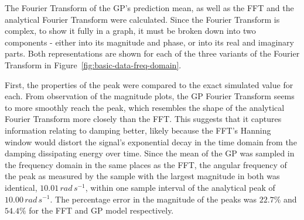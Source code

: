 \documentclass[12pt]{article}
\begin{document}
    The Fourier Transform of the GP's prediction mean, as well as the FFT and the analytical Fourier Transform were calculated.
    Since the Fourier Transform is complex, to show it fully in a graph, it must be broken down into two components - either into its magnitude and phase, or into its real and imaginary parts.
    Both representations are shown for each of the three variants of the Fourier Transform in Figure~\ref{fig:basic-data-freq-domain}.

    First, the properties of the peak were compared to the exact simulated value for each.
    From observation of the magnitude plots, the GP Fourier Transform seems to more smoothly reach the peak, which resembles the shape of the analytical Fourier Transform more closely than the FFT.
    This suggests that it captures information relating to damping better, likely because the FFT's Hanning window would distort the signal's exponential decay in the time domain from the damping dissipating energy over time.
    Since the mean of the GP was sampled in the frequency domain in the same places as the FFT, the angular frequency of the peak as measured by the sample with the largest magnitude in both was identical, $10.01 \, rad \, s^{-1}$, within one sample interval of the analytical peak of $10.00 \, rad \, s^{-1}$.
    The percentage error in the magnitude of the peaks was $22.7\%$ and $54.4\%$ for the FFT and GP model respectively.
\end{document}
